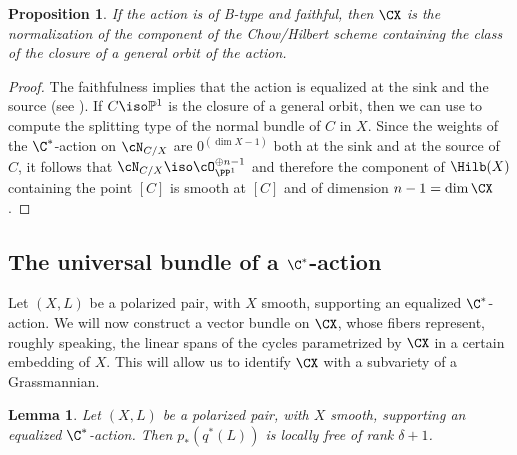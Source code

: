 \documentclass[reqno]{amsproc}
\newtheorem{lemma}[theorem]{Lemma}
\newtheorem{proposition}[theorem]{Proposition}
\theoremstyle{definition}
\begin{document}
\begin{proposition}\label{prop:comp}
If the action is of B-type and faithful, then  $\CX$ is the normalization of the component of the Chow/Hilbert scheme containing the class of the closure of a general orbit of the action.
\end{proposition}
\begin{proof}
The faithfulness implies that the action is equalized at the sink and the source (see \cite[Remark 3.2]{WORS1}).
If $C\iso\mathbb{P}^1$ is the closure of a general orbit, then we can use \cite[Lemma 2.16]{WORS1} to compute the splitting type of the normal bundle of $C$ in $X$. Since the weights of the $\C^*$-action on $\cN_{C/X}$ are $0^{(\dim X-1)}$ both at the sink and at the source of $C$,
it follows that $\cN_{C/X}\iso\cO_{\PP^1}^{\oplus n-1}$ and therefore the component of $\Hilb(X)$ containing the point $[C]$ is smooth at $[C]$ and of dimension $n-1 = \dim \CX$.
\end{proof}


\subsection{The universal bundle of a $\C^*$-action}\label{ssec:bundle}

Let $(X,L)$ be a polarized pair, with $X$ smooth, supporting an equalized $\C^*$-action.
We will now construct a vector bundle on $\CX$, whose fibers represent, roughly speaking, the linear spans  of the cycles parametrized by $\CX$ in a certain embedding of $X$. This will allow us to identify $\CX$ with a  subvariety of a Grassmannian. 

\begin{lemma}\label{lem:univbdl}
Let $(X,L)$ be a polarized pair, with $X$ smooth, supporting an equalized $\C^*$-action.  
Then $p_*(q^*(L))$ is locally free of rank $\delta+1$.
\end{lemma}
\end{document}
